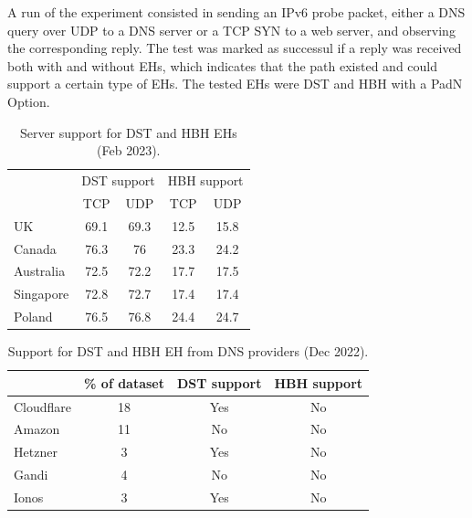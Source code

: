 \documentclass[conference]{IEEEtran}
\begin{document}
A run of the experiment consisted in sending an IPv6 probe packet, either a DNS
query over UDP to a DNS server or a TCP SYN to a web server, and observing the
corresponding reply.  The test was marked as successul if a reply was received
both with and without EHs, which indicates that the path existed and could
support a certain type of EHs.  The tested EHs were DST and HBH with a PadN Option.


\begin{table} 
\centering
\caption{Server support for DST and HBH EHs (Feb 2023). }
\begin{tabular}{p{1.5cm}|cc|cc}
\multicolumn{1}{l|}{} & \multicolumn{2}{p{2cm}|}{\centering DST support} 
                      & \multicolumn{2}{p{2cm}}{\centering HBH support} \\ \cline{2-5} 
\multicolumn{1}{l|}{} & \multicolumn{1}{c|}{TCP}   & UDP      & \multicolumn{1}{c|}{TCP}     & UDP   \\ \hline \hline
UK                    & \multicolumn{1}{c|}{69.1}  & 69.3     & \multicolumn{1}{c|}{12.5}    & 15.8  \\ \hline
Canada                & \multicolumn{1}{c|}{76.3}  & 76       & \multicolumn{1}{c|}{23.3}    & 24.2  \\ \hline
Australia             & \multicolumn{1}{c|}{72.5}  & 72.2     & \multicolumn{1}{c|}{17.7}    & 17.5  \\ \hline
Singapore             & \multicolumn{1}{c|}{72.8}  & 72.7     & \multicolumn{1}{c|}{17.4}    & 17.4  \\ \hline
Poland                & \multicolumn{1}{c|}{76.5}  & 76.8     & \multicolumn{1}{c|}{24.4}    & 24.7   
\end{tabular}
\label{tbl:e2e_traversal}
\end{table}


\begin{table} 
\centering
\caption{Support for DST and HBH EH from DNS providers (Dec 2022).}
\begin{tabular}{l|c|c|c}
           & \% of dataset &  DST support & HBH support\\
\hline \hline
Cloudflare & 18   & Yes  & No                 \\
\hline
Amazon     & 11   & No   & No                 \\
\hline
Hetzner    & 3    & Yes  & No                 \\
\hline
Gandi      & 4    & No   & No                 \\
\hline
Ionos      & 3    & Yes  & No                
\end{tabular}
\label{tbl:provider_support}
\end{table}
\end{document}
